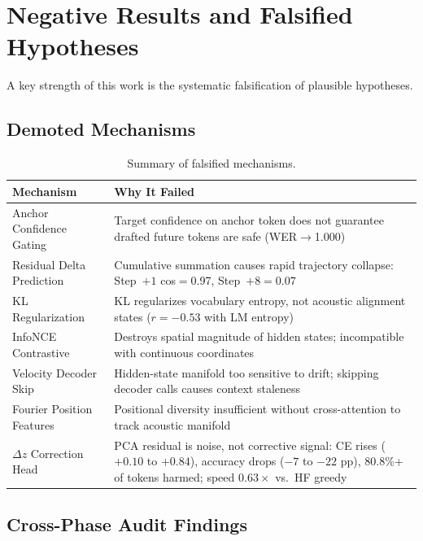 \documentclass[11pt,a4paper]{article}
\begin{document}
\section{Negative Results and Falsified Hypotheses}

A key strength of this work is the systematic falsification of plausible hypotheses.

\subsection{Demoted Mechanisms}

\begin{table}[H]
\centering
\small
\begin{tabular}{@{}p{3.5cm}p{9cm}@{}}
\toprule
\textbf{Mechanism} & \textbf{Why It Failed} \\
\midrule
Anchor Confidence Gating & Target confidence on anchor token does not guarantee drafted future tokens are safe (WER${\to}$1.000) \\
Residual Delta Prediction & Cumulative summation causes rapid trajectory collapse: Step~$+1$ cos${=}$0.97, Step~$+8{=}0.07$ \\
KL Regularization & KL regularizes vocabulary entropy, not acoustic alignment states ($r{=}{-}0.53$ with LM entropy) \\
InfoNCE Contrastive & Destroys spatial magnitude of hidden states; incompatible with continuous coordinates \\
Velocity Decoder Skip & Hidden-state manifold too sensitive to drift; skipping decoder calls causes context staleness \\
Fourier Position Features & Positional diversity insufficient without cross-attention to track acoustic manifold \\
$\Delta z$ Correction Head & PCA residual is noise, not corrective signal: CE rises ($+0.10$ to $+0.84$), accuracy drops ($-7$ to $-22$ pp), 80.8\%+ of tokens harmed; speed $0.63\times$ vs.\ HF greedy \\
\bottomrule
\end{tabular}
\caption{Summary of falsified mechanisms.}
\label{tab:negative}
\end{table}

\subsection{Cross-Phase Audit Findings}
\label{sec:audit}
\end{document}
